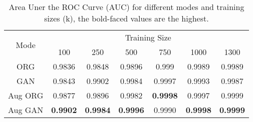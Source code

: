 \begin{table*}[htp]
    \centering
        \caption{Area Uner the ROC Curve (AUC) for different modes and training sizes (k), the bold-faced values are the highest.}
    \begin{tabular}{|*{7}{c|}}
    \hline
         \multirow{2}{*}{Mode}   & \multicolumn{6}{|c|}{Training Size}  \\\cline{2-7}
                                    & 100 & 250 & 500 & 750 & 1000 & 1300 \\\hline
        ORG                         & 0.9836 & 0.9848 & 0.9896 & 0.999 & 0.9989 & 0.9989 \\\hline
        GAN                         & 0.9843 & 0.9902 & 0.9984 & 0.9997 & 0.9993 & 0.9987\\\hline
        Aug ORG                     & 0.9877 & 0.9896 & 0.9982 & \textbf{0.9998} & 0.9997 & 0.9999\\\hline
        Aug GAN                     & \textbf{0.9902} & \textbf{0.9984} & \textbf{0.9996} & 0.9990 & \textbf{0.9998} & \textbf{0.9999}\\\hline
    \end{tabular}

    \label{tab:auc_mass_aug}
\end{table*}